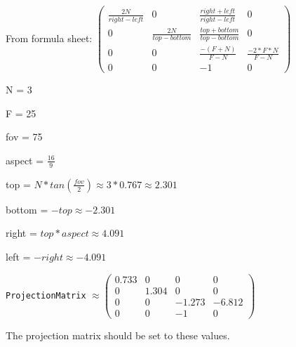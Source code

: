 From formula sheet: $
    \left(\begin{array}{cccc}
        \frac{2N}{right-left} & 0 & \frac{right + left}{right - left} & 0 \\
        0 & \frac{2N}{top - bottom} & \frac{top + bottom}{top - bottom} & 0 \\
        0 & 0 & \frac{-(F + N)}{F - N} & \frac{-2 * F * N}{F - N} \\
        0 & 0 & -1 & 0
    \end{array}\right)
$

N = 3

F = 25

fov = 75

aspect = $\frac{16}{9}$

top = $ N * tan\left(\frac{fov}{2}\right) \approx 3 * 0.767 \approx 2.301 $

bottom = $ -top \approx -2.301$

right = $top * aspect \approx 4.091$

left = $-right \approx -4.091$

\texttt{ProjectionMatrix}
$
\approx
    \left(\begin{array}{cccc}
        0.733 & 0 & 0 & 0 \\
        0 & 1.304 & 0 & 0 \\
        0 & 0 & -1.273 & -6.812 \\
        0 & 0 & -1 & 0
    \end{array}\right)
$

The projection matrix should be set to these values.
